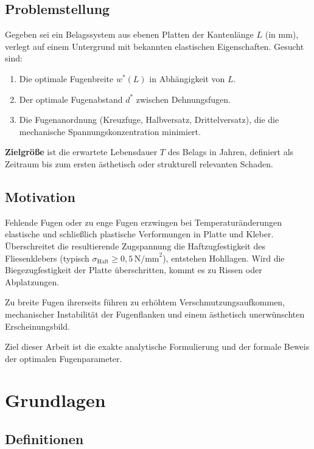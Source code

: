 ﻿\documentclass[a4paper,12pt]{article}
\theoremstyle{definition}
\begin{document}
\subsection{Problemstellung}

Gegeben sei ein Belagssystem aus ebenen Platten der Kantenlänge $L$
(in mm), verlegt auf einem Untergrund mit bekannten elastischen
Eigenschaften. Gesucht sind:
\begin{enumerate}
	\item Die optimale Fugenbreite $w^*(L)$ in Abhängigkeit von $L$.
	\item Der optimale Fugenabstand $d^*$ zwischen Dehnungsfugen.
	\item Die Fugenanordnung (Kreuzfuge, Halbversatz, Drittelversatz),
	      die die mechanische Spannungskonzentration minimiert.
\end{enumerate}

\textbf{Zielgröße} ist die erwartete Lebensdauer $T$ des Belags in Jahren,
definiert als Zeitraum bis zum ersten ästhetisch oder strukturell
relevanten Schaden.

\subsection{Motivation}

Fehlende Fugen oder zu enge Fugen erzwingen bei Temperaturänderungen
elastische und schließlich plastische Verformungen in Platte und Kleber.
Überschreitet die resultierende Zugspannung die Haftzugfestigkeit
des Fliesenklebers (typisch $\sigma_{\text{Haft}} \geq 0{,}5\,\text{N/mm}^2$),
entstehen Hohllagen. Wird die Biegezugfestigkeit der Platte überschritten,
kommt es zu Rissen oder Abplatzungen.

Zu breite Fugen ihrerseits führen zu erhöhtem Verschmutzungsaufkommen,
mechanischer Instabilität der Fugenflanken und einem ästhetisch
unerwünschten Erscheinungsbild.

Ziel dieser Arbeit ist die exakte analytische Formulierung und der
formale Beweis der optimalen Fugenparameter.

\section{Grundlagen}

\subsection{Definitionen}
\end{document}
